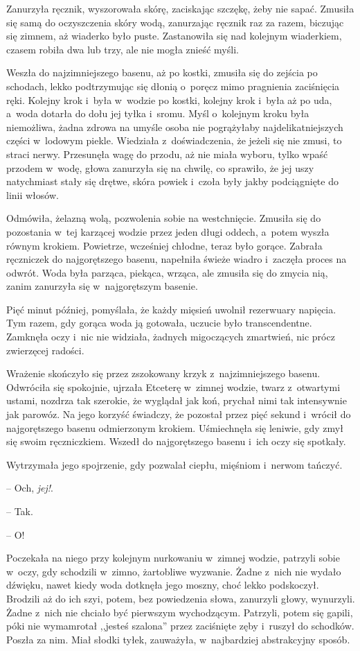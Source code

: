 \documentclass[oneside,polish,11pt,sfheadings]{mwbk}
\begin{document}
Zanurzyła ręcznik, wyszorowała skórę, zaciskając szczękę, żeby nie
sapać. Zmusiła się samą do oczyszczenia skóry wodą, zanurzając ręcznik
raz za razem, biczując się zimnem, aż wiaderko było puste. Zastanowiła
się nad kolejnym wiaderkiem, czasem robiła dwa lub trzy, ale nie mogła
znieść myśli.

Weszła do najzimniejszego basenu, aż po kostki, zmusiła się do zejścia
po schodach, lekko podtrzymując się dłonią o~poręcz mimo pragnienia
zaciśnięcia ręki. Kolejny krok i~była w~wodzie po kostki, kolejny krok i~była aż po uda, a~woda dotarła do dołu jej tyłka i~sromu. Myśl o~kolejnym kroku była niemożliwa, żadna zdrowa na umyśle osoba nie
pogrążyłaby najdelikatniejszych części w~lodowym piekle. Wiedziała z~doświadczenia, że jeżeli się nie zmusi, to straci nerwy. Przesunęła wagę
do przodu, aż nie miała wyboru, tylko wpaść przodem w~wodę, głowa
zanurzyła się na chwilę, co sprawiło, że jej uszy natychmiast stały się
drętwe, skóra powiek i~czoła były jakby podciągnięte do linii włosów.

Odmówiła, żelazną wolą, pozwolenia sobie na westchnięcie. Zmusiła się do
pozostania w~tej karzącej wodzie przez jeden długi oddech, a~potem
wyszła równym krokiem. Powietrze, wcześniej chłodne, teraz było gorące.
Zabrała ręczniczek do najgorętszego basenu, napełniła świeże wiadro i~zaczęła proces na odwrót. Woda była parząca, piekąca, wrząca, ale
zmusiła się do zmycia nią, zanim zanurzyła się w~najgorętszym basenie.

Pięć minut później, pomyślała, że każdy mięsień uwolnił rezerwuary
napięcia. Tym razem, gdy gorąca woda ją gotowała, uczucie było
transcendentne. Zamknęła oczy i~nic nie widziała, żadnych migoczących
zmartwień, nic prócz zwierzęcej radości.

Wrażenie skończyło się przez zszokowany krzyk z~najzimniejszego basenu.
Odwróciła się spokojnie, ujrzała Etceterę w~zimnej wodzie, twarz z~otwartymi ustami, nozdrza tak szerokie, że wyglądał jak koń, prychał
nimi tak intensywnie jak parowóz. Na jego korzyść świadczy, że pozostał
przez pięć sekund i~wrócił do najgorętszego basenu odmierzonym krokiem.
Uśmiechnęła się leniwie, gdy zmył się swoim ręczniczkiem. Wszedł do
najgorętszego basenu i~ich oczy się spotkały.

Wytrzymała jego spojrzenie, gdy pozwalał ciepłu, mięśniom i~nerwom
tańczyć.

-- Och, \textit{jej!}.

-- Tak.

-- O!

Poczekała na niego przy kolejnym nurkowaniu w~zimnej wodzie, patrzyli
sobie w~oczy, gdy schodzili w~zimno, żartobliwe wyzwanie. Żadne z~nich
nie wydało dźwięku, nawet kiedy woda dotknęła jego moszny, choć lekko
podskoczył. Brodzili aż do ich szyi, potem, bez powiedzenia słowa,
zanurzyli głowy, wynurzyli. Żadne z~nich nie chciało być pierwszym
wychodzącym. Patrzyli, potem się gapili, póki nie wymamrotał ,,jesteś
szalona'' przez zaciśnięte zęby i~ruszył do schodków. Poszła za nim.
Miał słodki tyłek, zauważyła, w~najbardziej abstrakcyjny sposób.
\end{document}
